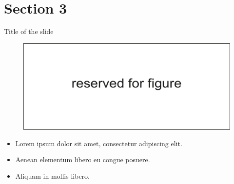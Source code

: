 \documentclass[russian,12pt,aspectratio=169,xcolor=table]{beamer}
\begin{document}
\section{Section 3}
\begin{frame}{Title of the slide}
	\begin{figure}
		\centering
		\includegraphics[scale=0.56]{img/7}
	\end{figure}
\begin{itemize}
	\item Lorem ipsum dolor sit amet, consectetur adipiscing elit. 
	\item Aenean elementum libero eu congue posuere.
	\item Aliquam in mollis libero. 
\end{itemize}
\end{frame}
\end{document}
